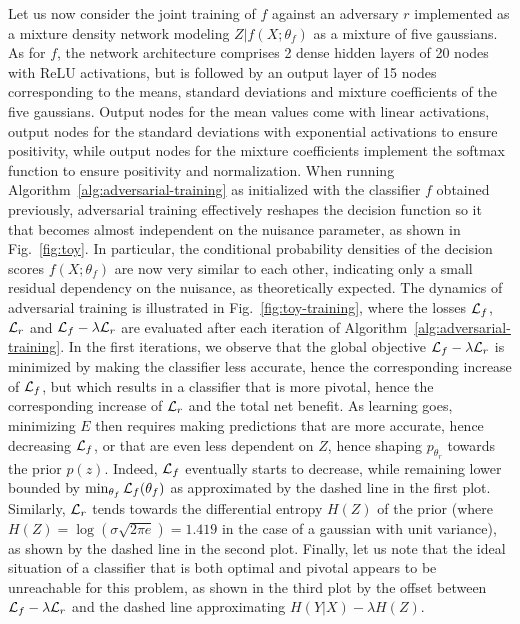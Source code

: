 \documentclass[twocolumn,superscriptaddress,aps]{revtex4-1}
\theoremstyle{plain}
\begin{document}
Let us now consider the joint training of $f$ against an adversary $r$
implemented as a mixture density network modeling $Z|f(X;\theta_f)$ as a mixture
of five gaussians. As for $f$, the network architecture comprises 2 dense hidden
layers of 20 nodes with ReLU activations, but is followed by an output layer of
15 nodes corresponding to the means, standard deviations and mixture
coefficients of the five gaussians. Output nodes for the mean values come with
linear activations, output nodes for the standard deviations with exponential
activations to ensure positivity, while output nodes for the mixture coefficients
implement the softmax function to ensure positivity and normalization. When
running Algorithm~\ref{alg:adversarial-training} as initialized with the
classifier $f$ obtained previously, adversarial training effectively reshapes
the decision function so it that becomes almost independent on the nuisance
parameter, as shown in Fig.~\ref{fig:toy}. In particular,
the conditional probability densities of the decision scores $f(X;\theta_f)$ are
now very similar to each other, indicating only a small residual  dependency on the
nuisance, as theoretically expected. The dynamics of adversarial training is
illustrated in Fig.~\ref{fig:toy-training}, where the losses ${\cal L}_f$,
${\cal L}_r$ and ${\cal L}_f - \lambda {\cal L}_r$ are evaluated after each
iteration of Algorithm~\ref{alg:adversarial-training}. In the first iterations,
we observe that the global objective ${\cal L}_f - \lambda {\cal L}_r$ is
minimized by making the classifier less accurate, hence the corresponding
increase of ${\cal L}_f$, but which results in a classifier that is more
pivotal, hence the corresponding increase of ${\cal L}_r$ and the total net
benefit. As learning goes, minimizing $E$ then requires making predictions that
are more accurate, hence decreasing ${\cal L}_f$, or that are even less dependent on
$Z$, hence shaping $p_{\theta_r}$ towards the prior $p(z)$. Indeed, ${\cal L}_f$
eventually starts to  decrease, while remaining lower bounded by
$\min_{\theta_f} {\cal L}_f(\theta_f)$ as approximated by the dashed line in the
first plot. Similarly,  ${\cal L}_r$ tends towards the differential entropy
$H(Z)$ of the prior (where $H(Z) = \log(\sigma \sqrt{2 \pi e}) = 1.419$ in the
case of a gaussian with unit variance), as shown by the dashed line in the
second plot.
Finally, let us note that the ideal situation of a
classifier that is both optimal and pivotal appears to be unreachable for this
problem, as shown in the third plot by the  offset between ${\cal L}_f - \lambda
{\cal L}_r$ and the dashed line approximating $H({Y|X}) -
\lambda H(Z)$.
\end{document}
